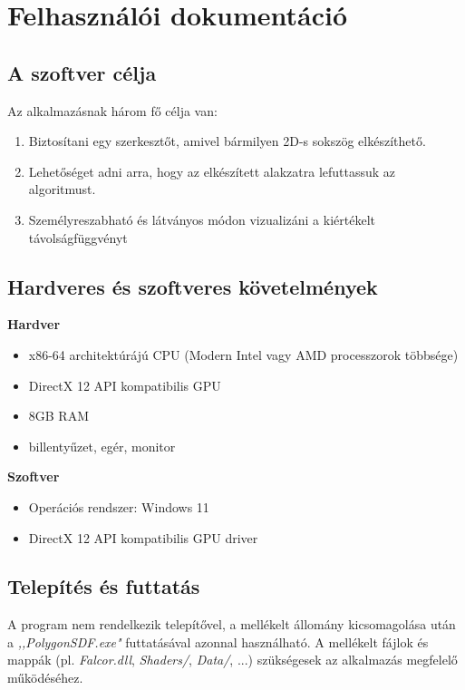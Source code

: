 \chapter{Felhasználói dokumentáció}
\label{ch:user}


\section{A szoftver célja}

Az alkalmazásnak három fő célja van:
\begin{enumerate}
    \item Biztosítani egy szerkesztőt, amivel bármilyen 2D-s sokszög elkészíthető.
    \item Lehetőséget adni arra, hogy az elkészített alakzatra lefuttassuk az algoritmust.
    \item Személyreszabható és látványos módon vizualizáni a kiértékelt távolságfüggvényt
\end{enumerate}


\section{Hardveres és szoftveres követelmények}

\textbf{Hardver}
\begin{itemize}
    \item x86-64 architektúrájú CPU (Modern Intel vagy AMD processzorok többsége)
    \item DirectX 12 API kompatibilis GPU
    \item 8GB RAM
    \item billentyűzet, egér, monitor
\end{itemize}

\textbf{Szoftver}
\begin{itemize}
    \item Operációs rendszer: Windows 11
    \item DirectX 12 API kompatibilis GPU driver
\end{itemize}


\section{Telepítés és futtatás}

A program nem rendelkezik telepítővel, a mellékelt állomány kicsomagolása után a \textit{,,PolygonSDF.exe"} futtatásával azonnal használható. A mellékelt fájlok és mappák (pl. \textit{Falcor.dll}, \textit{Shaders/}, \textit{Data/}, ...) szükségesek az alkalmazás megfelelő működéséhez.



